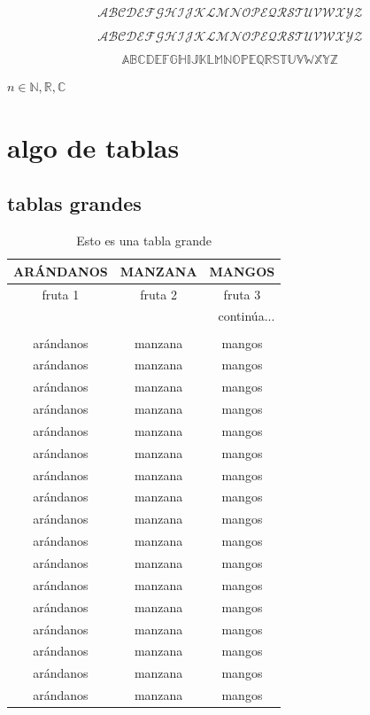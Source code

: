 \documentclass{report}
\begin{document}
$$
\mathcal{ABCDEFGHIJKLMNOPEQRSTUVWXYZ}
$$

$$
\mathscr{ABCDEFGHIJKLMNOPEQRSTUVWXYZ}
$$

$$
\mathds{ABCDEFGHIJKLMNOPEQRSTUVWXYZ}
$$

$n\in\mathds{N},\mathds{R},\mathds{C}$
	
\chapter{algo de tablas}	
\section{tablas grandes}	
	
\begin{longtable}{|c|c|c|}
	\caption{Esto es una tabla grande}\\
	ARÁNDANOS & MANZANA & MANGOS \\
	\endfirsthead
	fruta 1 & fruta 2 &  fruta 3\\
	\endhead
	\multicolumn{3}{r}{continúa...} \\
	\endfoot
	\multicolumn{3}{r}{fin} \\
	\endlastfoot
	\hline
	arándanos & manzana & mangos \\
	\hline
	arándanos & manzana & mangos \\
	arándanos & manzana & mangos \\
	\hline
		\hline
	arándanos & manzana & mangos \\
	\hline
	arándanos & manzana & mangos \\
	arándanos & manzana & mangos \\
	\hline
		\hline
	arándanos & manzana & mangos \\
	\hline
	arándanos & manzana & mangos \\
	arándanos & manzana & mangos \\
	\hline
		\hline
	arándanos & manzana & mangos \\
	\hline
	arándanos & manzana & mangos \\
	arándanos & manzana & mangos \\
	\hline
		\hline
	arándanos & manzana & mangos \\
	\hline
	arándanos & manzana & mangos \\
	arándanos & manzana & mangos \\
	\hline
		\hline
	arándanos & manzana & mangos \\
	\hline
	arándanos & manzana & mangos \\

\end{longtable}
\end{document}
